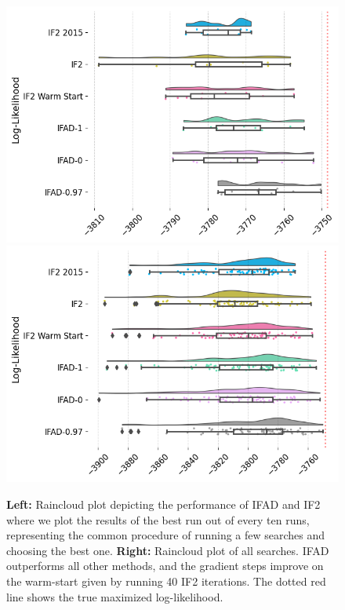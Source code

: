 \documentclass[9pt,twocolumn,pnasresearcharticle]{pnas-new}
\newcommand\arxiv[2]{#2} %
\begin{document}

  
\begin{figure}[ht]
    \includegraphics[width=\arxiv{8cm}{\textwidth/\real{4.2}}]{imgs/095/boxplot.png}
    \includegraphics[width=\arxiv{8cm}{\textwidth/\real{4.2}}]{imgs/095/boxplot_all.png}
    \caption{\textbf{Left:} Raincloud plot depicting the performance of IFAD and IF2 where we plot the results of the best run out of every ten runs, representing the common procedure of running a few searches and choosing the best one. \textbf{Right:} Raincloud plot of all searches. IFAD outperforms all other methods, and the gradient steps improve on the warm-start given by running 40 IF2 iterations.
    The dotted red line shows the true maximized log-likelihood.}
    \label{fig:boxplot}
    \arxiv{}{\vspace*{-5mm}}
\end{figure}
\end{document}
